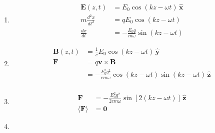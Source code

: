 \documentclass{article}
\renewcommand{\vec}[1]{\boldsymbol{\mathbf{#1}}}
\newcommand{\uvec}[1]{\hat{\vec{#1}}}
\begin{document}
\subsection{}

\begin{enumerate}
  \item

        \begin{align*}
          \vec{E}(z, t)         & = E_0 \cos (k z - \omega t) \,\uvec{x}          \\
          m \frac{d^2 x}{d t^2} & = q E_0 \cos (k z - \omega t)                   \\
          \frac{d x}{d t}       & = -\frac{E_0 q}{m \omega} \sin (k z - \omega t)
        \end{align*}

  \item

        \begin{align*}
          \vec{B}(z, t) & = \frac{1}{c} E_0 \cos (k z - \omega t) \,\uvec{y}                                     \\
          \vec{F}       & = q \vec{v} \times \vec{B}                                                             \\
                        & = -\frac{E_0^2 q^2}{c m \omega} \cos (k z - \omega t) \sin (k z - \omega t) \,\uvec{z} \\
        \end{align*}

  \item

        \begin{align*}
          \vec{F}                 & = -\frac{E_0^2 q^2}{2 c m \omega} \sin [2 (k z - \omega t)] \,\uvec{z} \\
          \langle \vec{F} \rangle & = \vec{0}
        \end{align*}

  \item


\end{enumerate}
\end{document}
